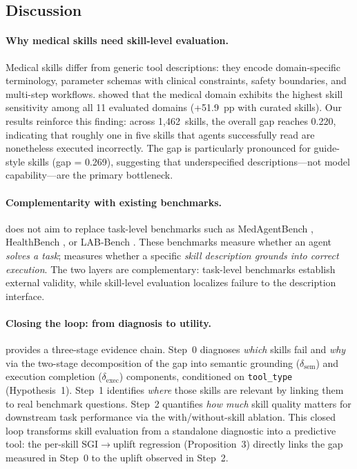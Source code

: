 \subsection{Discussion}
\label{ssec:discussion}

\paragraph{Why medical skills need skill-level evaluation.}
Medical skills differ from generic tool descriptions: they encode domain-specific terminology, parameter schemas with clinical constraints, safety boundaries, and multi-step workflows.
\citet{skillsbench2026} showed that the medical domain exhibits the highest skill sensitivity among all 11 evaluated domains (+51.9~pp with curated skills).
Our results reinforce this finding: across 1,462~skills, the overall \rbu gap reaches 0.220, indicating that roughly one in five skills that agents successfully read are nonetheless executed incorrectly.
The gap is particularly pronounced for guide-style skills (\rbu gap = 0.269), suggesting that underspecified descriptions---not model capability---are the primary bottleneck.

\paragraph{Complementarity with existing benchmarks.}
\medskillbench does not aim to replace task-level benchmarks such as MedAgentBench \citep{medagentbench2025}, HealthBench \citep{healthbench2025}, or LAB-Bench \citep{labbench2024}.
These benchmarks measure whether an agent \emph{solves a task}; \medskillbench measures whether a specific \emph{skill description grounds into correct execution}.
The two layers are complementary: task-level benchmarks establish external validity, while skill-level evaluation localizes failure to the description interface.

\paragraph{Closing the loop: from diagnosis to utility.}
\medskillbench provides a three-stage evidence chain.
Step~0 diagnoses \emph{which} skills fail and \emph{why} via the two-stage decomposition of the \rbu gap into semantic grounding ($\delta_{\text{sem}}$) and execution completion ($\delta_{\text{exec}}$) components, conditioned on \texttt{tool\_type} (Hypothesis~1).
Step~1 identifies \emph{where} those skills are relevant by linking them to real benchmark questions.
Step~2 quantifies \emph{how much} skill quality matters for downstream task performance via the with/without-skill ablation.
This closed loop transforms skill evaluation from a standalone diagnostic into a predictive tool: the per-skill SGI$\to$uplift regression (Proposition~3) directly links the \rbu gap measured in Step~0 to the uplift observed in Step~2.

